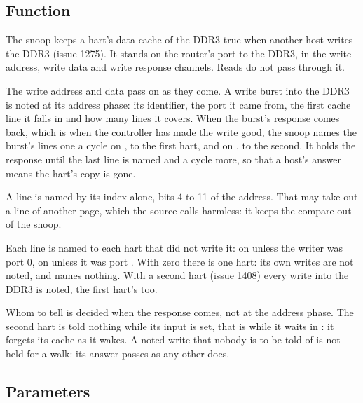 
%
{}%
{}

\subsection*{Function}

The snoop keeps a hart's data cache of the DDR3 true when another host
writes the DDR3 (issue 1275). It stands on the router's port to the
DDR3, in the write address, write data and write response channels.
Reads do not pass through it.

The write address and data pass on as they come. A write burst into
the DDR3 is noted at its address phase: its identifier, the port it
came from, the first cache line it falls in and how many lines it
covers. When the burst's response comes back, which is when the
controller has made the write good, the snoop names the burst's lines
one a cycle on , to the first hart, and on , to
the second. It holds the response until the last line is named and a
cycle more, so that a host's answer means the hart's copy is gone.

A line is named by its index alone, bits 4 to 11 of the address. That
may take out a line of another page, which the source calls harmless:
it keeps the compare out of the snoop.

Each line is named to each hart that did not write it: on 
unless the writer was port 0, on  unless it was port
. With  zero there is one hart: its own writes are
not noted, and  names nothing. With a second hart (issue
1408) every write into the DDR3 is noted, the first hart's too.

Whom to tell is decided when the response comes, not at the address
phase. The second hart is told nothing while its  input
is set, that is while it waits in : it forgets its cache as
it wakes. A noted write that nobody is to be told of is not held for a
walk: its answer passes as any other does.

\subsection*{Parameters}

